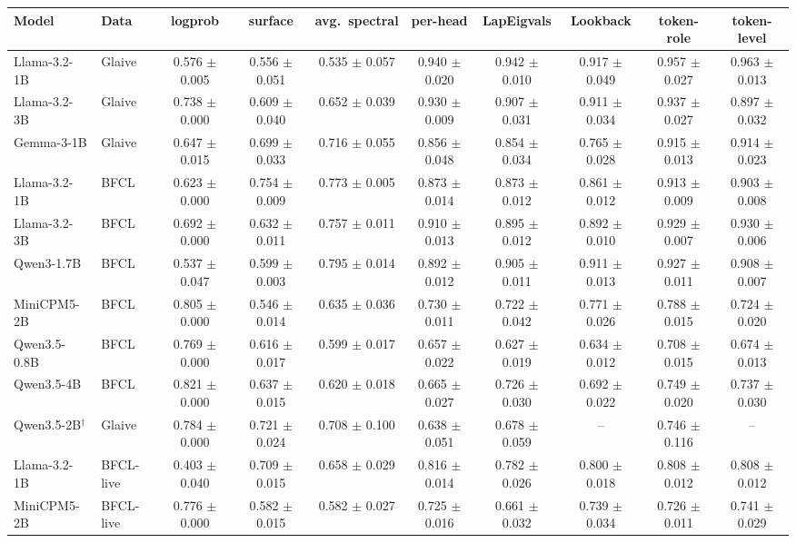 \begin{tabular}{llcccccccc}
\toprule
Model & Data & logprob & surface & avg.\ spectral & per-head & LapEigvals & Lookback & token-role & token-level \\
\midrule
Llama-3.2-1B & Glaive & 0.576 $\pm$ 0.005 & 0.556 $\pm$ 0.051 & 0.535 $\pm$ 0.057 & 0.940 $\pm$ 0.020 & 0.942 $\pm$ 0.010 & 0.917 $\pm$ 0.049 & 0.957 $\pm$ 0.027 & 0.963 $\pm$ 0.013 \\
Llama-3.2-3B & Glaive & 0.738 $\pm$ 0.000 & 0.609 $\pm$ 0.040 & 0.652 $\pm$ 0.039 & 0.930 $\pm$ 0.009 & 0.907 $\pm$ 0.031 & 0.911 $\pm$ 0.034 & 0.937 $\pm$ 0.027 & 0.897 $\pm$ 0.032 \\
Gemma-3-1B & Glaive & 0.647 $\pm$ 0.015 & 0.699 $\pm$ 0.033 & 0.716 $\pm$ 0.055 & 0.856 $\pm$ 0.048 & 0.854 $\pm$ 0.034 & 0.765 $\pm$ 0.028 & 0.915 $\pm$ 0.013 & 0.914 $\pm$ 0.023 \\
Llama-3.2-1B & BFCL & 0.623 $\pm$ 0.000 & 0.754 $\pm$ 0.009 & 0.773 $\pm$ 0.005 & 0.873 $\pm$ 0.014 & 0.873 $\pm$ 0.012 & 0.861 $\pm$ 0.012 & 0.913 $\pm$ 0.009 & 0.903 $\pm$ 0.008 \\
Llama-3.2-3B & BFCL & 0.692 $\pm$ 0.000 & 0.632 $\pm$ 0.011 & 0.757 $\pm$ 0.011 & 0.910 $\pm$ 0.013 & 0.895 $\pm$ 0.012 & 0.892 $\pm$ 0.010 & 0.929 $\pm$ 0.007 & 0.930 $\pm$ 0.006 \\
Qwen3-1.7B & BFCL & 0.537 $\pm$ 0.047 & 0.599 $\pm$ 0.003 & 0.795 $\pm$ 0.014 & 0.892 $\pm$ 0.012 & 0.905 $\pm$ 0.011 & 0.911 $\pm$ 0.013 & 0.927 $\pm$ 0.011 & 0.908 $\pm$ 0.007 \\
MiniCPM5-2B & BFCL & 0.805 $\pm$ 0.000 & 0.546 $\pm$ 0.014 & 0.635 $\pm$ 0.036 & 0.730 $\pm$ 0.011 & 0.722 $\pm$ 0.042 & 0.771 $\pm$ 0.026 & 0.788 $\pm$ 0.015 & 0.724 $\pm$ 0.020 \\
Qwen3.5-0.8B & BFCL & 0.769 $\pm$ 0.000 & 0.616 $\pm$ 0.017 & 0.599 $\pm$ 0.017 & 0.657 $\pm$ 0.022 & 0.627 $\pm$ 0.019 & 0.634 $\pm$ 0.012 & 0.708 $\pm$ 0.015 & 0.674 $\pm$ 0.013 \\
Qwen3.5-4B & BFCL & 0.821 $\pm$ 0.000 & 0.637 $\pm$ 0.015 & 0.620 $\pm$ 0.018 & 0.665 $\pm$ 0.027 & 0.726 $\pm$ 0.030 & 0.692 $\pm$ 0.022 & 0.749 $\pm$ 0.020 & 0.737 $\pm$ 0.030 \\
Qwen3.5-2B$^\dagger$ & Glaive & 0.784 $\pm$ 0.000 & 0.721 $\pm$ 0.024 & 0.708 $\pm$ 0.100 & 0.638 $\pm$ 0.051 & 0.678 $\pm$ 0.059 & -- & 0.746 $\pm$ 0.116 & -- \\
Llama-3.2-1B & BFCL-live & 0.403 $\pm$ 0.040 & 0.709 $\pm$ 0.015 & 0.658 $\pm$ 0.029 & 0.816 $\pm$ 0.014 & 0.782 $\pm$ 0.026 & 0.800 $\pm$ 0.018 & 0.808 $\pm$ 0.012 & 0.808 $\pm$ 0.012 \\
MiniCPM5-2B & BFCL-live & 0.776 $\pm$ 0.000 & 0.582 $\pm$ 0.015 & 0.582 $\pm$ 0.027 & 0.725 $\pm$ 0.016 & 0.661 $\pm$ 0.032 & 0.739 $\pm$ 0.034 & 0.726 $\pm$ 0.011 & 0.741 $\pm$ 0.029 \\
\bottomrule
\end{tabular}
